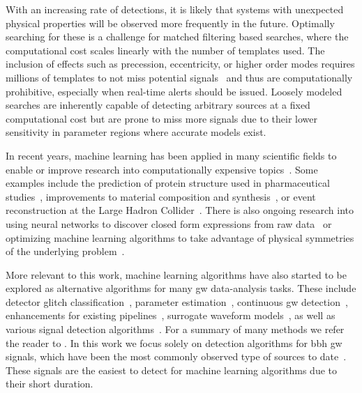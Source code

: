 With an increasing rate of detections, it is likely that systems with unexpected physical properties will be observed more frequently in the future. Optimally searching for these is a challenge for matched filtering based searches, where the computational cost scales linearly with the number of templates used. The inclusion of effects such as precession, eccentricity, or higher order modes requires millions of templates to not miss potential signals~\cite{Harry:2016ijz, Harry:2017weg, Dhurkunde:2022aek} and thus are computationally prohibitive, especially when real-time alerts should be issued. Loosely modeled searches are inherently capable of detecting arbitrary sources at a fixed computational cost but are prone to miss more signals due to their lower sensitivity in parameter regions where accurate models exist.

In recent years, machine learning has been applied in many scientific fields to enable or improve research into computationally expensive topics~\cite{Deiana:2021niw}. Some examples include the prediction of protein structure used in pharmaceutical studies~\cite{Alquraishi:2021aaa}, improvements to material composition and synthesis~\cite{Butler:2018aaa}, or event reconstruction at the Large Hadron Collider~\cite{Gray:2020mcm}. There is also ongoing research into using neural networks to discover closed form expressions from raw data~\cite{Cranmer:2020wew} or optimizing machine learning algorithms to take advantage of physical symmetries of the underlying problem~\cite{Smidt:2020tuy, Oxley:2021aaa, Dax:2021myb}.

More relevant to this work, machine learning algorithms have also started to be explored as alternative algorithms for many \acrshort{gw} data-analysis tasks. These include detector glitch classification~\cite{Zevin:2016qwy, George:2017fbn, Bahaadini:2018git}, parameter estimation~\cite{Chua:2019wwt, Gabbard:2019rde, Chatterjee:2019avs, Dax:2021tsq, McLeod:2022ccr}, continuous \acrshort{gw} detection~\cite{Dreissigacker:2019edy, Morawski:2019awi, Miller:2019jtp, Dreissigacker:2020xfr, Beheshtipour:2020zhb, Beheshtipour:2020nko, Yamamoto:2022adl}, enhancements for existing pipelines~\cite{Chatterjee:2019gqr, Cabero:2020eik, Jadhav:2020oyt, Williams:2021qyt, Mishra:2021tmu, Lopez:2021ikt, Mishra:2022ott, McIsaac:2022odb}, surrogate waveform models~\cite{Khan:2020fso, Nousi:2021arn, Fragkouli:2022lpt}, as well as various signal detection algorithms~\cite{George:2016hay, George:2017pmj, Gabbard:2017lja, Gebhard:2019ldz, Krastev:2019koe, Krastev:2020skk, Wei:2020ztw, Schafer:2020kor, Wei:2020sfz, Wei:2020xrl, Huerta:2020xyq, Skliris:2020qax, Morawski:2021kxv, Schafer:2021fea, Schafer:2021cml, Khan:2021vbf, Ruan:2021fxq, Chaturvedi:2022suc, Baltus:2022pep, Moreno:2021fvp, Bacon:2022lsm}. For a summary of many methods we refer the reader to \cite{Cuoco:2020ogp, Huerta:2021ybd}. In this work we focus solely on detection algorithms for \acrshort{bbh} \acrshort{gw} signals, which have been the most commonly observed type of sources to date~\cite{LIGOScientific:2020ibl, LIGOScientific:2021usb, Nitz:2021uxj}. These signals are the easiest to detect for machine learning algorithms due to their short duration.

